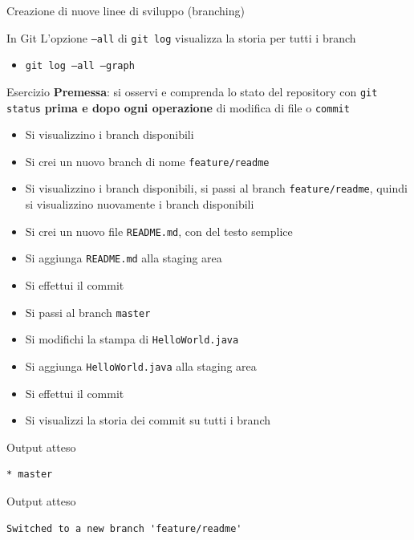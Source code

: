 \documentclass[xcolor=dvipsnames,presentation]{beamer}
\begin{document}
\begin{frame}{Creazione di nuove linee di sviluppo (branching)}
\begin{block}{In Git}
        L'opzione \texttt{--all} di \texttt{git log} visualizza la storia per tutti i branch
        \begin{itemize}
            \item \texttt{git log --all --graph}
        \end{itemize}
    \end{block}
    \begin{block}{Esercizio}
        \textbf{Premessa}: si osservi e comprenda lo stato del repository con \texttt{git status} \textbf{prima e dopo ogni operazione} di modifica di file o \texttt{commit}
        \begin{itemize}
            \footnotesize
            \item Si visualizzino i branch disponibili
            \item Si crei un nuovo branch di nome \texttt{feature/readme}
            \item Si visualizzino i branch disponibili, si passi al branch \texttt{feature/readme}, quindi si visualizzino nuovamente i branch disponibili
            \item Si crei un nuovo file \texttt{README.md}, con del testo semplice
            \item Si aggiunga \texttt{README.md} alla staging area
            \item Si effettui il commit
            \item Si passi al branch \texttt{master}
            \item Si modifichi la stampa di \texttt{HelloWorld.java}
            \item Si aggiunga \texttt{HelloWorld.java} alla staging area
            \item Si effettui il commit
            \item Si visualizzi la storia dei commit su tutti i branch
        \end{itemize}
    \end{block}
    \begin{block}{Output atteso}
        \begin{Verbatim}[fontsize=\scriptsize]
* master
        \end{Verbatim}
    \end{block}
    \begin{block}{Output atteso}
        \begin{Verbatim}[fontsize=\scriptsize]
Switched to a new branch 'feature/readme'
        \end{Verbatim}
    \end{block}

\end{frame}
\end{document}
